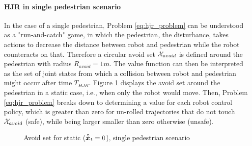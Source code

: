 \paragraph{\ac{HJR} in single pedestrian scenario}
In the case of a single pedestrian, Problem \ref{eq:hjr_problem} can be understood as a "run-and-catch" game, in which the pedestrian, the disturbance, takes actions to decrease the distance between robot and pedestrian while the robot counteracts on that. Therefore a circular avoid set $\mathcal{X}_{avoid}$ is defined around the pedestrian with radius $R_{avoid} = 1m$. The value function can then be interpreted as the set of joint states from which a collision between robot and pedestrian might occur after time $T_{HJR}$.
\newline
Figure \ref{img:hj_game} displays the avoid set around the pedestrian in a static case, i.e., when only the robot would move. Then, Problem \ref{eq:hjr_problem} breaks down to determining a value for each robot control policy, which is greater than zero for un-rolled trajectories that do not touch $\mathcal{X}_{avoid}$ (safe), while being larger smaller than zero otherwise (unsafe).

\begin{figure}[!ht]
\begin{center}
\end{center}
\caption{Avoid set for static ($\dxped[]_t = 0$), single pedestrian scenario}
\label{img:hj_game}
\end{figure}

